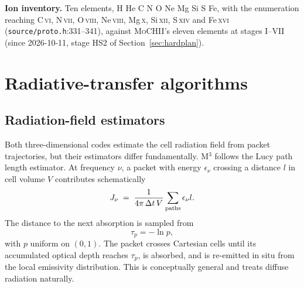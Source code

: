 \documentclass[english,a4paper]{my_memo}
\newcommand{\code}[1]{\texttt{#1}}
\newcommand{\MoCHII}{\textsc{MoCHII}}
\newcommand{\Mthree}{M$^3$}
\begin{document}
\textbf{Ion inventory.}  Ten elements, H He C N O Ne Mg Si S Fe, with the
enumeration reaching C\,\textsc{vi}, N\,\textsc{vii}, O\,\textsc{viii},
Ne\,\textsc{viii}, Mg\,\textsc{x}, Si\,\textsc{xii}, S\,\textsc{xiv} and
Fe\,\textsc{xvi} (\code{source/proto.h}:331--341), against \MoCHII{}'s
eleven elements at stages I--VII (since 2026-10-11, stage HS2 of
Section~\ref{sec:hardplan}).

\section{Radiative-transfer algorithms}

\subsection{Radiation-field estimators}

Both three-dimensional codes estimate the cell radiation field from packet trajectories, but
their estimators differ fundamentally.  \Mthree{} follows the Lucy path
length estimator.  At frequency $\nu$, a packet with energy
$\epsilon_\nu$ crossing a distance $l$ in cell volume $V$ contributes
schematically
\begin{equation}
 J_\nu \;=\; \frac{1}{4\pi\,\Delta t\,V}
       \sum_{\rm paths}\epsilon_\nu l .
 \label{eq:m3j}
\end{equation}
The distance to the next absorption is sampled from
\begin{equation}
 \tau_p=-\ln p,
 \label{eq:taup}
\end{equation}
with $p$ uniform on $(0,1)$.  The packet crosses Cartesian cells until its
accumulated optical depth reaches $\tau_p$, is absorbed, and is re-emitted
in situ from the local emissivity distribution.  This is conceptually
general and treats diffuse radiation naturally.
\end{document}
